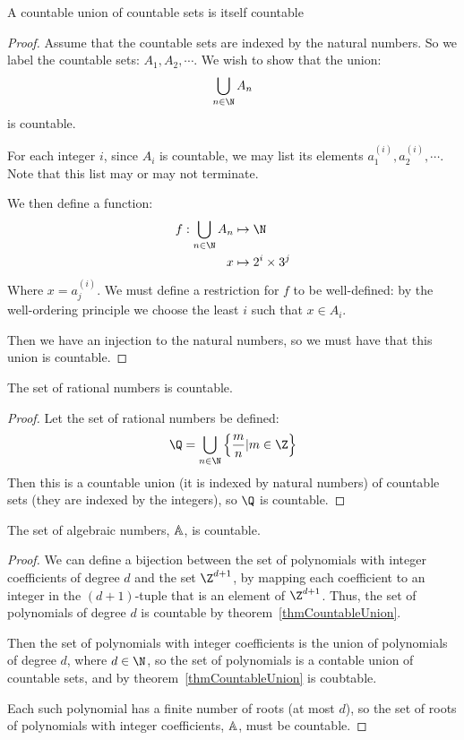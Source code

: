\documentclass[../Main.tex]{subfiles}
\begin{document}
\begin{theorem}
    A countable union of countable sets is itself countable
    \label{thmCountableUnion}
\end{theorem}
\begin{proof}
    Assume that the countable sets are indexed by the natural numbers. So we label the countable sets: $A_1, A_2, \cdots$. We wish to show that the union: 
    \begin{equation*}
        \bigcup_{n\in\N} A_n
    \end{equation*}
    is countable.\par
    For each integer $i$, since $A_i$ is countable, we may list its elements $a_1^{(i)}, a_2^{(i)}, \cdots$. Note that this list may or may not terminate.\par
    We then define a function:
    \begin{align*}
        f: \bigcup_{n\in\N} A_n &\mapsto \N \\
        x &\mapsto 2^i \times 3^j
    \end{align*}
    Where $x = a_j^{(i)}$. We must define a restriction for $f$ to be well-defined: by the well-ordering principle we choose the least $i$ such that $x \in A_i$.\par
    Then we have an injection to the natural numbers, so we must have that this union is countable.
\end{proof}
\begin{corollary}
    \label{corQCountable}
    The set of rational numbers is countable.
\end{corollary}
\begin{proof}
    Let the set of rational numbers be defined:
    \begin{equation*}
        \Q = \bigcup_{n \in \N} \left\{\frac{m}{n} | m \in \Z\right\}
    \end{equation*}
    Then this is a countable union (it is indexed by natural numbers) of countable sets (they are indexed by the integers), so $\Q$ is countable.
\end{proof}
\begin{theorem}
    \label{thmAlgebraicCountable}
    The set of algebraic numbers, $\mathbb{A}$, is countable.
\end{theorem}
\begin{proof}
    We can define a bijection between the set of polynomials with integer coefficients of degree $d$ and the set $\Z^{d+1}$, by mapping each coefficient to an integer in the $(d+1)$-tuple that is an element of $\Z^{d+1}$. Thus, the set of polynomials of degree $d$ is countable by theorem~\ref{thmCountableUnion}.\par
    Then the set of polynomials with integer coefficients is the union of polynomials of degree $d$, where $d \in \N$, so the set of polynomials is a contable union of countable sets, and by theorem~\ref{thmCountableUnion} is coubtable.\par
    Each such polynomial has a finite number of roots (at most $d$), so the set of roots of polynomials with integer coefficients, $\mathbb{A}$, must be countable.
\end{proof}
\end{document}
